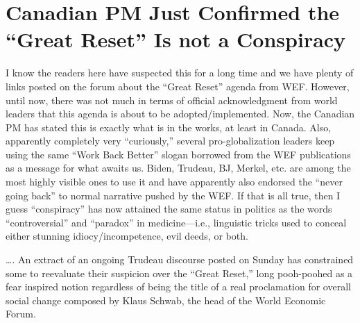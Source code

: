 \chapter{Canadian PM Just Confirmed the \enquote{Great Reset} Is not a Conspiracy}

\begin{refsection}

I know the readers here have suspected this for a long time and we have plenty of links posted on the forum about the \enquote{Great Reset} agenda from WEF. However, until now, there was not much in terms of official acknowledgment from world leaders that this agenda is about to be adopted/implemented. Now, the Canadian PM has stated this is exactly what is in the works, at least in Canada. Also, apparently completely very \enquote{curiously,} several pro-globalization leaders keep using the same \enquote{Work Back Better} slogan borrowed from the WEF publications as a message for what awaits us. Biden, Trudeau, BJ, Merkel, etc. are among the most highly visible ones to use it and have apparently also endorsed the \enquote{never going back} to normal narrative pushed by the WEF. If that is all true, then I guess \enquote{conspiracy} has now attained the same status in politics as the words \enquote{controversial} and \enquote{paradox} in medicine---i.e., linguistic tricks used to conceal either stunning idiocy/incompetence, evil deeds, or both.

\begin{tcolorbox}[quote]

\dots{}. An extract of an ongoing Trudeau discourse posted on Sunday has constrained some to reevaluate their suspicion over the \enquote{Great Reset,} long pooh-poohed as a fear inspired notion regardless of being the title of a real proclamation for overall social change composed by Klaus Schwab, the head of the World Economic Forum.\textsuperscript{\cite{url1c2369ee}}

\end{tcolorbox}

\begin{tcolorbox}[quote]


\end{tcolorbox}
\end{refsection}
